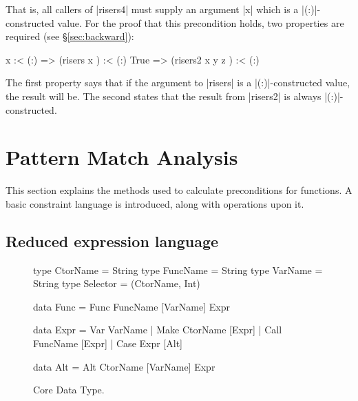 \noindent That is, all callers of |risers4| must supply an argument |x| which is a |(:)|-constructed value. For the proof that this precondition holds, two properties are required (see \S\ref{sec:backward}):

\ignore\begin{code}
x :< (:)  => (risers x       ) :< (:)
True      => (risers2 x y z  ) :< (:)
\end{code}

\noindent The first property says that if the argument to |risers| is a |(:)|-constructed value, the result will be. The second states that the result from |risers2| is always |(:)|-constructed.

\section{Pattern Match Analysis}
\label{sec:manipulate}

This section explains the methods used to calculate preconditions for functions. A basic constraint language is introduced, along with operations upon it.

\subsection{Reduced expression language}
\label{sec:core}

\begin{figure}
\begin{code}
type CtorName  =  String
type FuncName  =  String
type VarName   =  String
type Selector  =  (CtorName, Int)

data Func  =  Func FuncName [VarName] Expr

data Expr  =  Var   VarName
           |  Make  CtorName  [Expr]
           |  Call  FuncName  [Expr]
           |  Case  Expr      [Alt]

data Alt   =  Alt CtorName [VarName] Expr
\end{code}
\caption{Core Data Type.}
\label{fig:core}
\end{figure}

